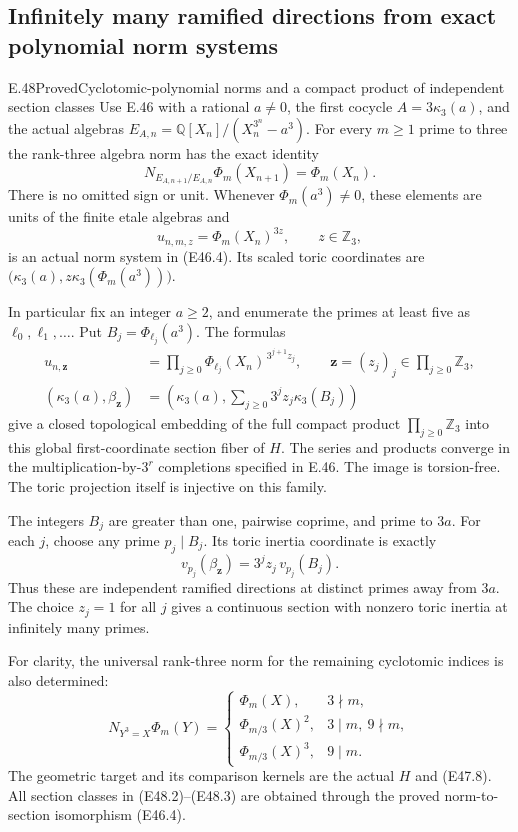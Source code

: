 \subsection{Infinitely many ramified directions from exact polynomial norm systems}

\begin{statement}{E.48}{Proved}{Cyclotomic-polynomial norms and a compact product of independent section classes}
Use E.46 with a rational $a\ne0$, the first cocycle
$A=3\kappa_3(a)$, and the actual algebras
$E_{A,n}=\mathbb Q[X_n]/(X_n^{3^n}-a^3)$.
For every $m\ge1$ prime to three the rank-three
algebra norm has the exact identity
\[
 N_{E_{A,n+1}/E_{A,n}}\Phi_m(X_{n+1})=\Phi_m(X_n).
 \tag{E48.1}
\]
There is no omitted sign or unit. Whenever
$\Phi_m(a^3)\ne0$, these elements are units of the
finite etale algebras and
\[
        u_{n,m,z}=\Phi_m(X_n)^{3z},\qquad z\in\mathbb Z_3,
 \tag{E48.2}
\]
is an actual norm system in (E46.4). Its scaled
toric coordinates are
$\bigl(\kappa_3(a),z\kappa_3(\Phi_m(a^3))\bigr)$.

In particular fix an integer $a\ge2$, and enumerate
the primes at least five as $\ell_0,\ell_1,\ldots$.
Put $B_j=\Phi_{\ell_j}(a^3)$. The formulas
\[
 \begin{split}
 u_{n,\mathbf z}
     &=\prod_{j\ge0}
           \Phi_{\ell_j}(X_n)^{\,3^{j+1}z_j},
       \qquad\mathbf z=(z_j)_j\in\prod_{j\ge0}\mathbb Z_3,\\
 (\kappa_3(a),\beta_{\mathbf z})
     &=\left(\kappa_3(a),
              \sum_{j\ge0}3^jz_j\kappa_3(B_j)\right)
 \end{split}
 \tag{E48.3}
\]
give a closed topological embedding of the full compact
product $\prod_{j\ge0}\mathbb Z_3$ into this global
first-coordinate section fiber of $H$. The series and
products converge in the multiplication-by-$3^r$
completions specified in E.46. The image is torsion-free.
The toric projection itself is injective on this family.

The integers $B_j$ are greater than one, pairwise
coprime, and prime to $3a$. For each $j$, choose any
prime $p_j\mid B_j$. Its toric inertia coordinate is
exactly
\[
       v_{p_j}(\beta_{\mathbf z})
          =3^jz_j\,v_{p_j}(B_j).
 \tag{E48.4}
\]
Thus these are independent ramified directions at
distinct primes away from $3a$. The choice $z_j=1$
for all $j$ gives a continuous section with nonzero
toric inertia at infinitely many primes.

For clarity, the universal rank-three norm for the
remaining cyclotomic indices is also determined:
\[
 N_{Y^3=X}\Phi_m(Y)=
 \begin{cases}
     \Phi_m(X),&3\nmid m,\\
     \Phi_{m/3}(X)^2,&3\mid m,\ 9\nmid m,\\
     \Phi_{m/3}(X)^3,&9\mid m.
 \end{cases}
 \tag{E48.5}
\]
The geometric target and its comparison kernels are
the actual $H$ and (E47.8). All section classes in
(E48.2)--(E48.3) are obtained through the proved
norm-to-section isomorphism (E46.4).


\end{statement}
